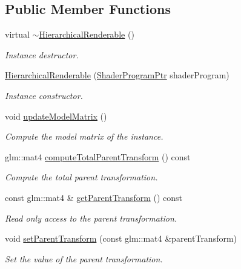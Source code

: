 \subsection*{Public Member Functions}
\begin{DoxyCompactItemize}
\item 
virtual \hyperlink{classHierarchicalRenderable_a5b52660ebd8fc6ae221baf813359c5dc}{$\sim$\+Hierarchical\+Renderable} ()
\begin{DoxyCompactList}\small\item\em Instance destructor. \end{DoxyCompactList}\item 
\hyperlink{classHierarchicalRenderable_ad4869fc0d6af636308bef824d4882d66}{Hierarchical\+Renderable} (\hyperlink{ShaderProgram_8hpp_af8e4af1ad4c53875ee5d32ab7e1f4966}{Shader\+Program\+Ptr} shader\+Program)
\begin{DoxyCompactList}\small\item\em Instance constructor. \end{DoxyCompactList}\item 
void \hyperlink{classHierarchicalRenderable_a5f63685ed92393c8c43362540934b6c1}{update\+Model\+Matrix} ()
\begin{DoxyCompactList}\small\item\em Compute the model matrix of the instance. \end{DoxyCompactList}\item 
glm\+::mat4 \hyperlink{classHierarchicalRenderable_ac9ae8fd8114c2f8ce274b22661435d69}{compute\+Total\+Parent\+Transform} () const 
\begin{DoxyCompactList}\small\item\em Compute the total parent transformation. \end{DoxyCompactList}\item 
const glm\+::mat4 \& \hyperlink{classHierarchicalRenderable_ad2481b795d921e43d2697e36e5086727}{get\+Parent\+Transform} () const 
\begin{DoxyCompactList}\small\item\em Read only access to the parent transformation. \end{DoxyCompactList}\item 
void \hyperlink{classHierarchicalRenderable_aca80e8715bc7844967047602c5f9bb2d}{set\+Parent\+Transform} (const glm\+::mat4 \&parent\+Transform)
\begin{DoxyCompactList}\small\item\em Set the value of the parent transformation. \end{DoxyCompactList}\item 

\end{DoxyCompactItemize}
